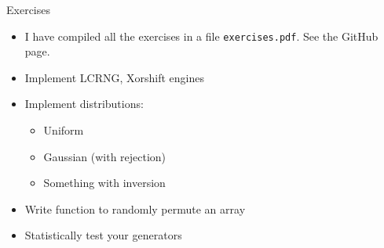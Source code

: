 \documentclass[10pt]{beamer}
\begin{document}
\begin{frame}[fragile,label={sec:org9243f1c}]{Exercises}
 \begin{itemize}
\item I have compiled all the exercises in a file \texttt{exercises.pdf}. See the GitHub
page.
\item Implement LCRNG, Xorshift engines
\item Implement distributions:
\begin{itemize}
\item Uniform
\item Gaussian (with rejection)
\item Something with inversion
\end{itemize}
\item Write function to randomly permute an array
\item Statistically test your generators
\end{itemize}
\end{frame}
\end{document}
